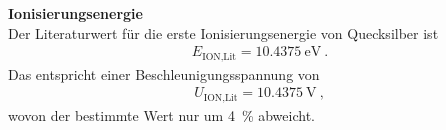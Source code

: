 \textbf{Ionisierungsenergie} \\
Der Literaturwert für die erste Ionisierungsenergie von Quecksilber \cite{CODATA} ist
\begin{align}
	E_\text{ION,Lit} = \SI{10.4375}{\electronvolt} \ .
\end{align}
Das entspricht einer Beschleunigungsspannung von 
\begin{align}
	U_\text{ION,Lit} = \SI{10.4375}{\volt} \ ,
\end{align}
wovon der bestimmte Wert nur um \SI{4}{\%} abweicht.
